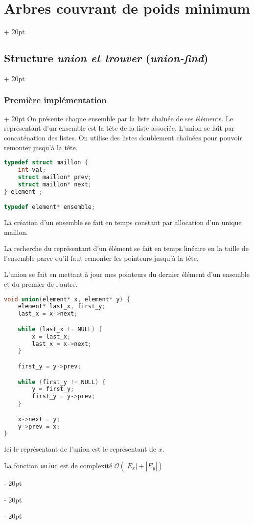 \documentclass[a4paper, 12pt, twoside]{article}
\newcommand{\abs}[1]{\left\lvert #1 \right\rvert}
\newcommand{\ind}[1][20pt]{\advance\leftskip + #1}
\newcommand{\deind}[1][20pt]{\advance\leftskip - #1}
\newenvironment{indt}[2][20pt]{#2 \par \ind[#1]}{\par \deind} %
\begin{document}
\begin{indt}{\section{Arbres couvrant de poids minimum}}
\begin{indt}{\subsection{Structure \textit{union et trouver} (\textit{union-find})}}
            \vspace{12pt}
            
            \begin{indt}{\subsubsection{Première implémentation}}
                On présente chaque ensemble par la liste chaînée de ses éléments. Le représentant d'un ensemble est la tête de la liste associée.
                L'union se fait par concaténation des listes.
                On utilise des listes doublement chaînées pour pouvoir remonter jusqu'à la tête.

                \begin{lstlisting}[language=C, xleftmargin=80pt]
typedef struct maillon {
    int val;
    struct maillon* prev;
    struct maillon* next;
} element ;

typedef element* ensemble;\end{lstlisting}

                La création d'un ensemble se fait en temps constant par allocation d'un unique maillon.

                La recherche du représentant d'un élément se fait en temps linéaire en la taille de l'ensemble parce qu'il faut remonter les pointeurs jusqu'à la tête.

                L'union se fait en mettant à jour mes pointeurs du dernier élément d'un ensemble et du premier de l'autre.

                \begin{lstlisting}[language=C, xleftmargin=80pt]
void union(element* x, element* y) {
    element* last_x, first_y;
    last_x = x->next;

    while (last_x != NULL) {
        x = last_x;
        last_x = x->next;
    }

    first_y = y->prev;

    while (first_y != NULL) {
        y = first_y;
        first_y = y->prev;
    }

    x->next = y;
    y->prev = x;
}\end{lstlisting}

                Ici le représentant de l'union est le représentant de $x$.

                La fonction \texttt{union} est de complexité $\mathcal O(\abs{E_x} + \abs{E_y})$

                \vspace{6pt}
                

\end{indt}
\end{indt}
\end{indt}
\end{document}
